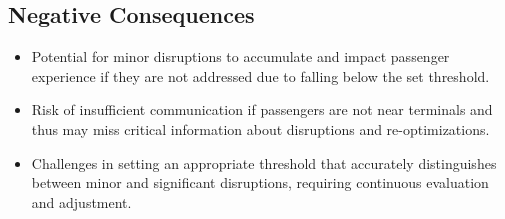 \subsection*{Negative Consequences}
\begin{itemize}
    \item Potential for minor disruptions to accumulate and impact passenger experience if they are not addressed due to falling below the set threshold.
    \item Risk of insufficient communication if passengers are not near terminals and thus may miss critical information about disruptions and re-optimizations.
    \item Challenges in setting an appropriate threshold that accurately distinguishes between minor and significant disruptions, requiring continuous evaluation and adjustment.
\end{itemize}
